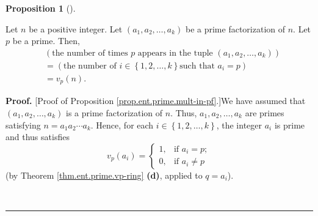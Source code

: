 \documentclass[numbers=enddot,12pt,final,onecolumn,notitlepage]{scrartcl}%
\numberwithin{exer}{subsection}
\theoremstyle{definition}
\newtheorem{prop}[theo]{Proposition}
\newenvironment{proposition}[1][]
{\begin{prop}[#1]\begin{leftbar}}
{\end{leftbar}\end{prop}}
\newenvironment{proof}[1][Proof]{\noindent\textbf{#1.} }{\ \rule{0.5em}{0.5em}}
\begin{document}
\begin{proposition}
\label{prop.ent.prime.mult-in-pf}Let $n$ be a positive integer. Let $\left(
a_{1},a_{2},\ldots,a_{k}\right)  $ be a prime factorization of $n$. Let $p$ be
a prime. Then,%
\begin{align*}
&  \left(  \text{the number of times }p\text{ appears in the tuple }\left(
a_{1},a_{2},\ldots,a_{k}\right)  \right) \\
&  =\left(  \text{the number of }i\in\left\{  1,2,\ldots,k\right\}  \text{
such that }a_{i}=p\right) \\
&  =v_{p}\left(  n\right)  .
\end{align*}

\end{proposition}

\begin{proof}
[Proof of Proposition \ref{prop.ent.prime.mult-in-pf}.]We have assumed that
$\left(  a_{1},a_{2},\ldots,a_{k}\right)  $ is a prime factorization of $n$.
Thus, $a_{1},a_{2},\ldots,a_{k}$ are primes satisfying $n=a_{1}a_{2}\cdots
a_{k}$. Hence, for each $i\in\left\{  1,2,\ldots,k\right\}  $, the integer
$a_{i}$ is prime and thus satisfies%
\begin{equation}
v_{p}\left(  a_{i}\right)  =%
\begin{cases}
1, & \text{if }a_{i}=p;\\
0, & \text{if }a_{i}\neq p
\end{cases}
\label{pf.prop.ent.prime.mult-in-pf.1}%
\end{equation}
(by Theorem \ref{thm.ent.prime.vp-ring} \textbf{(d)}, applied to $q=a_{i}$).


\end{proof}
\end{document}
